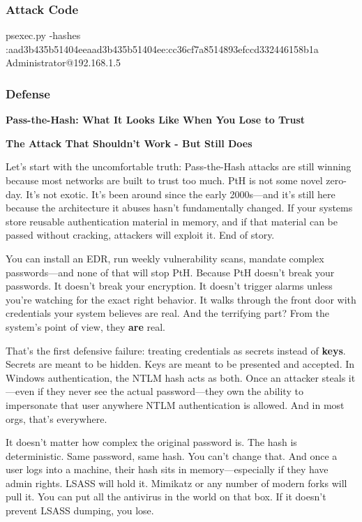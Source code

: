 \subsubsection{\textbf{  Attack Code}}

psexec.py -hashes :aad3b435b51404eeaad3b435b51404ee:cc36cf7a8514893efccd332446158b1a Administrator@192.168.1.5

\subsubsection{\textbf{  Defense}}

\textbf{Pass-the-Hash: What It Looks Like When You Lose to Trust}

\textbf{The Attack That Shouldn’t Work - But Still Does}

Let’s start with the uncomfortable truth: Pass-the-Hash attacks are still winning because most networks are built to trust too much. PtH is not some novel zero-day. It’s not exotic. It’s been around since the early 2000s—and it’s still here because the architecture it abuses hasn’t fundamentally changed. If your systems store reusable authentication material in memory, and if that material can be passed without cracking, attackers will exploit it. End of story.

You can install an EDR, run weekly vulnerability scans, mandate complex passwords—and none of that will stop PtH. Because PtH doesn’t break your passwords. It doesn’t break your encryption. It doesn’t trigger alarms unless you’re watching for the exact right behavior. It walks through the front door with credentials your system believes are real. And the terrifying part? From the system’s point of view, they \textbf{are} real.

That’s the first defensive failure: treating credentials as secrets instead of \textbf{keys}. Secrets are meant to be hidden. Keys are meant to be presented and accepted. In Windows authentication, the NTLM hash acts as both. Once an attacker steals it—even if they never see the actual password—they own the ability to impersonate that user anywhere NTLM authentication is allowed. And in most orgs, that’s everywhere.

It doesn’t matter how complex the original password is. The hash is deterministic. Same password, same hash. You can’t change that. And once a user logs into a machine, their hash sits in memory—especially if they have admin rights. LSASS will hold it. Mimikatz or any number of modern forks will pull it. You can put all the antivirus in the world on that box. If it doesn't prevent LSASS dumping, you lose.

